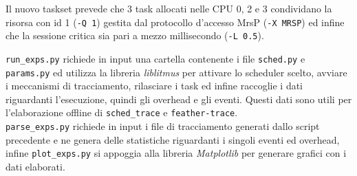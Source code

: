 \begin{appendices}
\noindent Il nuovo taskset prevede che 3 task allocati nelle CPU 0, 2 e 3 condividano la risorsa con id 1 (\texttt{-Q 1}) gestita dal protocollo d'accesso MrsP (\texttt{-X MRSP}) ed infine che la sessione critica sia pari a mezzo millisecondo (\texttt{-L 0.5}).

\noindent \texttt{run\_exps.py} richiede in input una cartella contenente i file \texttt{sched.py} e \texttt{params.py} ed utilizza la libreria \textit{liblitmus} per attivare lo scheduler scelto, avviare i meccanismi di tracciamento, rilasciare i task ed infine raccoglie i dati riguardanti l'esecuzione, quindi gli overhead e gli eventi. Questi dati sono utili per l'elaborazione offline di \texttt{sched\_trace} e \texttt{feather-trace}.\\

\noindent \texttt{parse\_exps.py} richiede in input i file di tracciamento generati dallo script precedente e ne genera delle statistiche riguardanti i singoli eventi ed overhead, infine \texttt{plot\_exps.py} si appoggia alla libreria \textit{Matplotlib} per generare grafici con i dati elaborati.

\end{appendices}